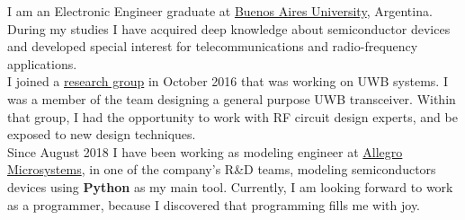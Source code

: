 \documentclass[10pt,a4paper]{altacv}
\begin{document}


\begin{fullwidth}
    \makecvheader
\end{fullwidth}



\justifying
I am an Electronic Engineer graduate at \href{http://www.fi.uba.ar/}{Buenos Aires University}, Argentina. During my studies I have acquired deep knowledge about semiconductor devices and developed special interest for telecommunications and radio-frequency applications. \\

I joined a \href{https://csc.conicet.gov.ar/research/microwave-laboratory/}{research group} in October 2016 that was working on UWB systems. I was a member of the team designing a general purpose UWB transceiver. Within that group, I had the opportunity to work with RF circuit design experts, and be exposed to new design techniques. \\

Since August 2018 I have been working as modeling engineer at \href{https://www.allegromicro.com/}{Allegro Microsystems}, in one of the company’s R\&D teams, modeling semiconductors devices using \textbf{Python} as my main tool. Currently, I am looking forward to work as a programmer, because I discovered that programming fills me with joy.
\end{document}
